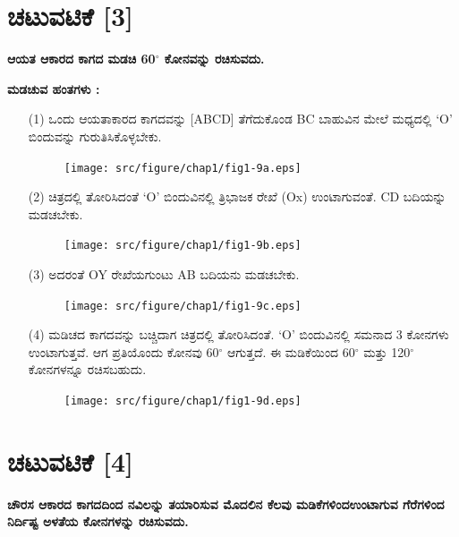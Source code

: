 \section*{ಚಟುವಟಿಕೆ [3]} \textbf{ಆಯತ ಆಕಾರದ ಕಾಗದ ಮಡಚಿ 60$^\circ$ ಕೋನವನ್ನು ರಚಿಸುವದು.}

\textbf{ಮಡಚುವ ಹಂತಗಳು :}
\begin{enumerate}
\item[(1)] ಒಂದು ಆಯತಾಕಾರದ ಕಾಗದವನ್ನು [ABCD] ತೆಗೆದುಕೊಂಡ BC ಬಾಹುವಿನ ಮೇಲೆ ಮಧ್ಯದಲ್ಲಿ `O' ಬಿಂದುವನ್ನು ಗುರುತಿಸಿಕೊಳ್ಳಬೇಕು. 
\begin{figure}[H]
\centering
\texttt{[image: src/figure/chap1/fig1-9a.eps]}
\end{figure}

\item[(2)] ಚಿತ್ರದಲ್ಲಿ ತೋರಿಸಿದಂತೆ  `O' ಬಿಂದುವಿನಲ್ಲಿ ತ್ರಿಭಾಜಕ ರೇಖೆ (Ox) ಉಂಟಾಗು\break ವಂತೆ. CD ಬದಿಯನ್ನು ಮಡಚಬೇಕು.  
\begin{figure}[H]
\centering
\texttt{[image: src/figure/chap1/fig1-9b.eps]}
\end{figure}

\item[(3)] ಅದರಂತೆ OY ರೇಖೆಯಗುಂಟು AB ಬದಿಯನು ಮಡಚಬೇಕು. 
\begin{figure}[H]
\centering
\texttt{[image: src/figure/chap1/fig1-9c.eps]}
\end{figure}

\item[(4)] ಮಡಿಚದ ಕಾಗದವನ್ನು ಬಚ್ಚಿದಾಗ  ಚಿತ್ರದಲ್ಲಿ ತೋರಿಸಿದಂತೆ. `O' ಬಿಂದುವಿನಲ್ಲಿ ಸಮನಾದ 3 ಕೋನಗಳು ಉಂಟಾಗುತ್ತವೆ. ಆಗ ಪ್ರತಿಯೊಂದು ಕೋನವು 60$^\circ$ ಆಗುತ್ತದೆ. ಈ ಮಡಿಕೆಯಿಂದ 60$^\circ$ ಮತ್ತು 120$^\circ$ ಕೋನಗಳನ್ನೂ ರಚಿಸಬಹುದು. 
\begin{figure}[H]
\centering
\texttt{[image: src/figure/chap1/fig1-9d.eps]}
\end{figure}
\end{enumerate}

\section*{ಚಟುವಟಿಕೆ [4]} \textbf{ಚೌರಸ ಆಕಾರದ ಕಾಗದದಿಂದ ನವಿಲನ್ನು ತಯಾರಿಸುವ ಮೊದಲಿನ ಕೆಲವು ಮಡಿಕೆಗಳಿಂದ\break ಉಂಟಾಗುವ ಗೆರೆಗಳಿಂದ ನಿರ್ದಿಷ್ಟ ಅಳತೆಯ ಕೋನಗಳನ್ನು ರಚಿಸುವದು.} 


